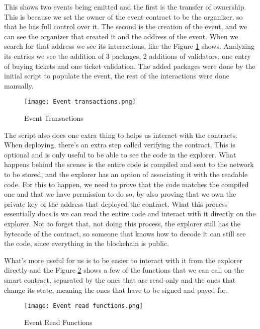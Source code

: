 This shows two events being emitted and the first is the transfer of ownership.
This is because we set the owner of the event contract to be the organizer, so
that he has full control over it. The second is the creation of the event, and
we can see the organizer that created it and the address of the event. When we
search for that address we see its interactions, like the Figure
\ref{fig:event_transactions} shows. Analyzing its entries we see the addition
of 3 packages, 2 additions of validators, one entry of buying tickets and one
ticket validation. The added packages were done by the initial script to
populate the event, the rest of the interactions were done manually.

\begin{figure}[H]
    \texttt{[image: Event transactions.png]}
    \centering
    \caption{Event Transactions}
    \label{fig:event_transactions}
\end{figure}

The script also does one extra thing to helps us interact with the contracts.
When deploying, there's an extra step called verifying the contract. This is
optional and is only useful to be able to see the code in the explorer. What
happens behind the scenes is the entire code is compiled and sent to the
network to be stored, and the explorer has an option of associating it with the
readable code. For this to happen, we need to prove that the code matches the
compiled one and that we have permission to do so, by also proving that we own
the private key of the address that deployed the contract. What this process
essentially does is we can read the entire code and interact with it directly
on the explorer. Not to forget that, not doing this process, the explorer still
has the bytecode of the contract, so someone that knows how to decode it can
still see the code, since everything in the blockchain is public.

What's more useful for us is to be easier to interact with it from the explorer
directly and the Figure \ref{fig:event_read_functions} shows a few of the
functions that we can call on the smart contract, separated by the ones that
are read-only and the ones that change its state, meaning the ones that have to
be signed and payed for.

\begin{figure}[H]
    \texttt{[image: Event read functions.png]}
    \centering
    \caption{Event Read Functions}
    \label{fig:event_read_functions}
\end{figure}

